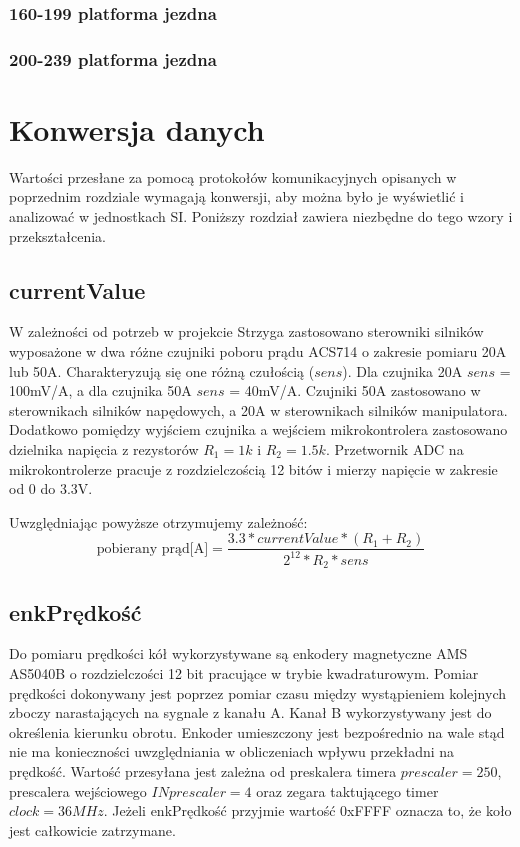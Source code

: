 \documentclass{article}
\begin{document}
\subsubsection*{160-199 platforma jezdna}
\subsubsection*{200-239 platforma jezdna}	

\section{Konwersja danych}

Wartości przesłane za pomocą protokołów komunikacyjnych opisanych w poprzednim rozdziale wymagają konwersji, aby można było je wyświetlić i analizować w jednostkach SI. Poniższy rozdział zawiera niezbędne do tego wzory i przekształcenia. 
\subsection{currentValue}
W zależności od potrzeb w projekcie Strzyga zastosowano sterowniki silników wyposażone w dwa różne czujniki poboru prądu ACS714 o zakresie pomiaru \textpm 20A lub \textpm 50A. Charakteryzują się one różną czułością ($sens$). Dla czujnika 20A $sens$ = 100mV/A, a dla czujnika 50A $sens$ = 40mV/A. Czujniki 50A zastosowano w sterownikach silników napędowych, a 20A w sterownikach silników manipulatora. 
Dodatkowo pomiędzy wyjściem czujnika a wejściem mikrokontrolera zastosowano dzielnika napięcia z rezystorów $R_1 = 1k$ i $R_2 = 1.5k$. 
Przetwornik ADC na mikrokontrolerze pracuje z rozdzielczością 12 bitów i mierzy napięcie w zakresie od 0 do 3.3V.

Uwzględniając powyższe otrzymujemy zależność:
$$
\textrm{pobierany prąd[A]}=\frac{3.3*currentValue*(R_1+R_2)}{2^{12}*R_2*sens}
$$
\subsection{enkPrędkość}
Do pomiaru prędkości kół wykorzystywane są enkodery magnetyczne AMS AS5040B o rozdzielczości 12 bit pracujące w trybie kwadraturowym. Pomiar prędkości dokonywany jest poprzez pomiar czasu między wystąpieniem kolejnych zboczy narastających na sygnale z kanału A. Kanał B wykorzystywany jest do określenia kierunku obrotu. Enkoder umieszczony jest bezpośrednio na wale stąd nie ma konieczności uwzględniania w obliczeniach wpływu przekładni na prędkość. 
Wartość przesyłana jest zależna od preskalera timera $prescaler=250$, prescalera wejściowego $INprescaler=4$ oraz zegara taktującego timer $clock = 36MHz$.
Jeżeli enkPrędkość przyjmie wartość 0xFFFF oznacza to, że koło jest całkowicie zatrzymane. 
\end{document}
